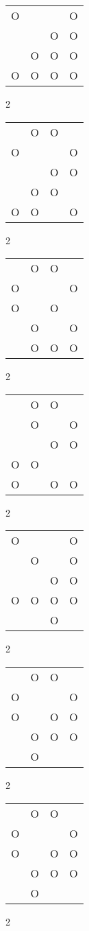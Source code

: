 \begin{tabular}{|m{0.2cm}m{0.2cm}m{0.2cm}m{0.2cm}|}\hline
O& & &O\\
 & &O&O\\
 &O&O&O\\
O&O&O&O\\
\hline\end{tabular}2
\begin{tabular}{|m{0.2cm}m{0.2cm}m{0.2cm}m{0.2cm}|}\hline
 &O&O& \\
O& & &O\\
 & &O&O\\
 &O&O& \\
O&O& &O\\
\hline\end{tabular}2
\begin{tabular}{|m{0.2cm}m{0.2cm}m{0.2cm}m{0.2cm}|}\hline
 &O&O& \\
O& & &O\\
O& &O& \\
 &O& &O\\
 &O&O&O\\
\hline\end{tabular}2
\begin{tabular}{|m{0.2cm}m{0.2cm}m{0.2cm}m{0.2cm}|}\hline
 &O&O& \\
 &O& &O\\
 & &O&O\\
O&O& & \\
O& &O&O\\
\hline\end{tabular}2
\begin{tabular}{|m{0.2cm}m{0.2cm}m{0.2cm}m{0.2cm}|}\hline
O& & &O\\
 &O& &O\\
 & &O&O\\
O&O&O&O\\
 & &O& \\
\hline\end{tabular}2
\begin{tabular}{|m{0.2cm}m{0.2cm}m{0.2cm}m{0.2cm}|}\hline
 &O&O& \\
O& & &O\\
O& &O&O\\
 &O&O&O\\
 &O& & \\
\hline\end{tabular}2
\begin{tabular}{|m{0.2cm}m{0.2cm}m{0.2cm}m{0.2cm}|}\hline
 &O&O& \\
O& & &O\\
O& &O&O\\
 &O&O&O\\
 &O& & \\
\hline\end{tabular}2
